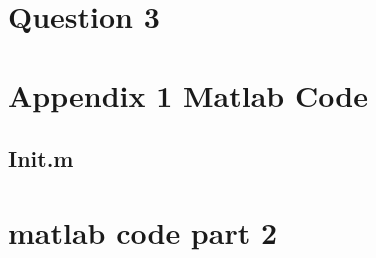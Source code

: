 \documentclass[10pt,twocolumn,letterpaper]{article}
\begin{document}
\section{Question 3}




{\small


}

\onecolumn
\appendix
\section{Appendix 1 Matlab Code}
\subsection{Init.m}


\section{matlab code part 2}

\end{document}

